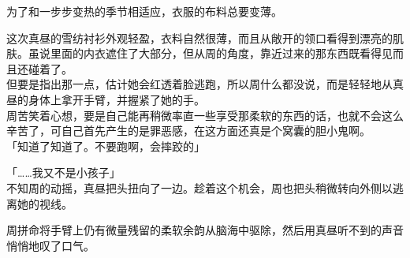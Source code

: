 为了和一步步变热的季节相适应，衣服的布料总要变薄。

这次真昼的雪纺衬衫外观轻盈，衣料自然很薄，而且从敞开的领口看得到漂亮的肌肤。虽说里面的内衣遮住了大部分，但从周的角度，靠近过来的那东西既看得见而且还碰着了。\\

但要是指出那一点，估计她会红透着脸逃跑，所以周什么都没说，而是轻轻地从真昼的身体上拿开手臂，并握紧了她的手。\\

周苦笑着心想，要是自己能再稍微率直一些享受那柔软的东西的话，也就不会这么辛苦了，可自己首先产生的是罪恶感，在这方面还真是个窝囊的胆小鬼啊。\\

「知道了知道了。不要跑啊，会摔跤的」

「……我又不是小孩子」\\

不知周的动摇，真昼把头扭向了一边。趁着这个机会，周也把头稍微转向外侧以逃离她的视线。

周拼命将手臂上仍有微量残留的柔软余韵从脑海中驱除，然后用真昼听不到的声音悄悄地叹了口气。
